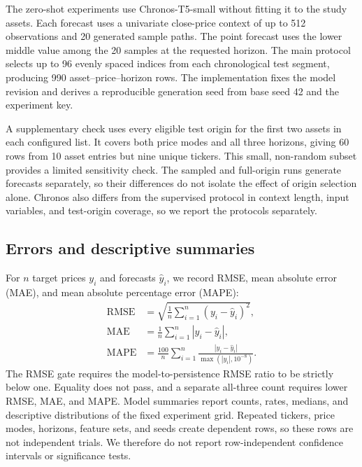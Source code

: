 The zero-shot experiments use Chronos-T5-small without fitting it to the study assets. Each forecast uses a univariate close-price context of up to 512 observations and 20 generated sample paths. The point forecast uses the lower middle value among the 20 samples at the requested horizon. The main protocol selects up to 96 evenly spaced indices from each chronological test segment, producing 990 asset--price--horizon rows. The implementation fixes the model revision and derives a reproducible generation seed from base seed 42 and the experiment key.

A supplementary check uses every eligible test origin for the first two assets in each configured list. It covers both price modes and all three horizons, giving 60 rows from 10 asset entries but nine unique tickers. This small, non-random subset provides a limited sensitivity check. The sampled and full-origin runs generate forecasts separately, so their differences do not isolate the effect of origin selection alone. Chronos also differs from the supervised protocol in context length, input variables, and test-origin coverage, so we report the protocols separately.

\subsection{Errors and descriptive summaries}

For $n$ target prices $y_i$ and forecasts $\hat y_i$, we record RMSE, mean absolute error (MAE), and mean absolute percentage error (MAPE):
\begin{align}
\mathrm{RMSE} &= \sqrt{\frac{1}{n}\sum_{i=1}^{n}(y_i-\hat y_i)^2}, \\
\mathrm{MAE} &= \frac{1}{n}\sum_{i=1}^{n}|y_i-\hat y_i|, \\
\mathrm{MAPE} &= \frac{100}{n}\sum_{i=1}^{n}\frac{|y_i-\hat y_i|}{\max(|y_i|,10^{-8})}.
\end{align}
The RMSE gate requires the model-to-persistence RMSE ratio to be strictly below one. Equality does not pass, and a separate all-three count requires lower RMSE, MAE, and MAPE. Model summaries report counts, rates, medians, and descriptive distributions of the fixed experiment grid. Repeated tickers, price modes, horizons, feature sets, and seeds create dependent rows, so these rows are not independent trials. We therefore do not report row-independent confidence intervals or significance tests.
